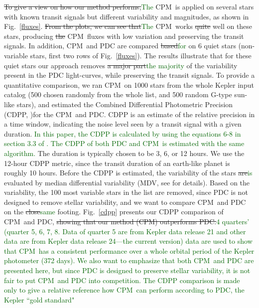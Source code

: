 \documentclass[12pt, preprint]{aastex}
\newcommand{\name}{CPM}
\newcommand{\revise}[1]{\textcolor{darkgreen}{#1}}
\newcommand{\remove}[1]{\sout{#1}}
\begin{document}
\remove{To give a view on how our method performs,}\revise{The} \name\ is applied on several stars with known transit signals but different variability and magnitudes, as shown in Fig.~\ref{fluxes}. 
\remove{From the plots, we can see that}\revise{The} \name\ works \remove{quite} well on these stars, producing \remove{the} \name\ fluxes 
with low variation and preserving the transit signals.
In addition, \name\ and PDC are compared \remove{based}\revise{for} on 6 quiet stars 
(non-variable stars, first two rows of Fig.~\ref{fluxes}). 
The results illustrate that for these quiet stars our approach removes 
\remove{a major part}\revise{the majority} of the variability present in the PDC light-curves, while preserving the transit signals. 
To provide a quantitative comparison, we ran \name\ on 1000 stars from the whole Kepler input catalog 
(500 chosen randomly from the whole list, and 500 random G-type sun-like stars), 
and estimated the Combined Differential Photometric Precision (CDPP,  \citealt{cdpp1} )for the \name\ and PDC.  
CDPP is an estimate of the relative precision in a time window, 
indicating the noise level seen by a transit signal with a given duration. 
\revise{In this paper, the CDPP is calculated by using the equations 6-8 in section 3.3 of \citealt{cdpp1}. The CDPP of both PDC and \name\ is estimated with the same algorithm.} 
The duration is typically chosen to be 3, 6, or 12 hours. 
We use the 12-hour CDPP metric, since the transit duration of an earth-like planet is roughly 10 hours. 
Before the CDPP is estimated, the variability of the stars \remove{are}\revise{is} evaluated by median differential variability 
  (MDV, see \citealt{basri2013} for details). 
Based on the variability, the 100 most variable stars in the list are removed, 
  since PDC is not designed to remove stellar variability, 
  and we want to compare \name\ and PDC on the \remove{close}\revise{same} footing.
Fig.~\ref{cdpp} presents our CDPP comparison of \name\ and PDC, 
  \remove{showing that our method (\name) outperforms PDC.}\revise{4 quarters' (quarter 5, 6, 7, 8. Data of quarter 5 are from Kepler data release 21 and other data are from Kepler data release 24---the current version) data are used to show that \name\ has a consistent performance over a whole orbital period of the Kepler photometer (372 days). We also want to emphasize that both \name\ and PDC are presented here, but since PDC is designed to preserve stellar variability, it is not fair to put \name\ and PDC into competition. The CDPP comparison is made only to give a relative reference how \name\ can perform according to PDC, the Kepler ``gold standard"}
\end{document}
